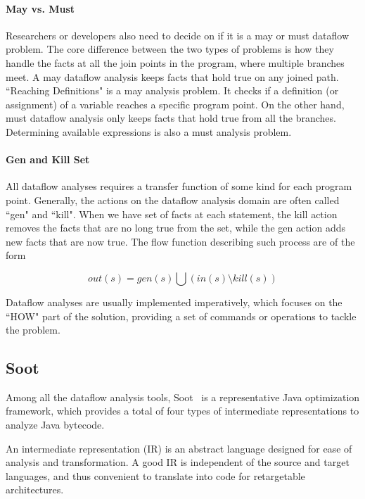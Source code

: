 \paragraph{May vs. Must} Researchers or developers also need to decide on if it is a may or must dataflow problem. The core difference between the two types of problems is how they handle the facts at all the join points in the program, where multiple branches meet. A may dataflow analysis keeps facts that hold true on any joined path. ``Reaching Definitions" is a may analysis problem. It checks if a definition (or assignment) of a variable reaches a specific program point. On the other hand, must dataflow analysis only keeps facts that hold true from all the branches. Determining available expressions is also a must analysis problem.

\paragraph{Gen and Kill Set} All dataflow analyses requires a transfer function of some kind for each program point. Generally, the actions on the dataflow analysis domain are often called ``gen" and ``kill". When we have set of facts at each statement, the kill action removes the facts that are no long true from the set, while the gen action adds new facts that are now true. The flow function describing such process are of the form

\begin{equation}
out(s) = gen(s) \bigcup (in(s)  \setminus  kill(s))
\end{equation}

Dataflow analyses are usually implemented imperatively, which focuses on the ``HOW" part of the solution, providing a set of commands or operations to tackle the problem.

\subsection{Soot}

Among all the dataflow analysis tools, Soot~\cite{Vallee-Rai:1999:SJB:781995.782008} is a representative Java optimization framework, which provides a total of four types of intermediate representations to analyze Java bytecode. 

An intermediate representation (IR) is an abstract language designed for ease of analysis and transformation. A good IR is independent of the source and target languages, and thus convenient to translate into code for retargetable architectures.

